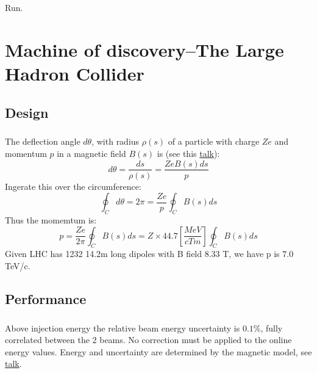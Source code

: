 \begin{savequote}[75mm]
Run.
\end{savequote}

\chapter{Machine of discovery--The Large Hadron Collider}

\section{Design}
\paragraph{}
The deflection angle $d\theta$, with radius $\rho(s)$ of a particle with charge $Ze$ and momentum $p$ in a magnetic field $B(s)$ is (see this \href{https://indico.cern.ch/event/626458/contributions/2529616/attachments/1434511/2205263/LHC-Ecal.ATLAS-plenary.Mar17.pdf}{talk}):
\begin{equation}
d\theta = \frac{ds}{\rho(s)} = \frac{ZeB(s)ds}{p}
\end{equation}
Ingerate this over the circumference:
\begin{equation}
\oint_C d\theta = 2\pi = \frac{Ze}{p} \oint_C B(s)ds
\end{equation}
Thus the momemtum is:
\begin{equation}
p = \frac{Ze}{2\pi}\oint_C B(s)ds = Z \times 44.7[\frac{MeV}{cTm}] \oint_C B(s)ds
\end{equation}
Given LHC has 1232 14.2m long dipoles with B field 8.33 T, we have p is $7.0$ TeV/c.

\section{Performance}
\paragraph{} 
Above injection energy the relative beam energy uncertainty is $0.1\%$, fully correlated between the 2 beams. No correction must be applied to the online energy values. Energy and uncertainty are determined by the magnetic model, see \href{https://indico.cern.ch/event/626458/contributions/2529616/attachments/1434511/2205263/LHC-Ecal.ATLAS-plenary.Mar17.pdf}{talk}.